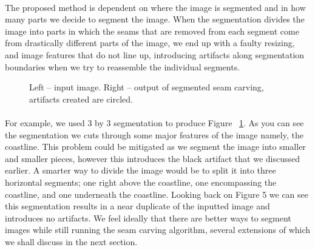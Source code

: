 \documentclass[conference]{acmsiggraph}
\begin{document}
\paragraph{}
The proposed method is dependent on where the image is segmented and in how many parts we decide to segment the image. When the segmentation divides the image into parts in which the seams that are removed from each segment come from drastically different parts of the image, we end up with a faulty resizing, and image features that do not line up, introducing artifacts along segmentation boundaries when we try to reassemble the individual segments. 
\begin{figure}[ht]
    \caption{Left -- input image. Right -- output of segmented seam carving, artifacts created are circled.}
    \label{fig:Beach_in_and_out}
\end{figure}
\paragraph{}
For example, we used 3 by 3 segmentation to produce Figure ~\ref{fig:Beach_in_and_out}.  As you can see the segmentation we cuts through some major features of the image namely, the coastline.  This problem could be mitigated as we segment the image into smaller and smaller pieces, however this introduces the black artifact that we discussed earlier.  A smarter way to divide the image would be to split it into three horizontal segments; one right above the coastline, one encompassing the coastline, and one underneath the coastline.  Looking back on Figure 5 we can see this segmentation results in a near duplicate of the inputted image and introduces no artifacts.  We feel ideally that there are better ways to segment images while still running the seam carving algorithm, several extensions of which we shall discuss in the next section.  
\end{document}
